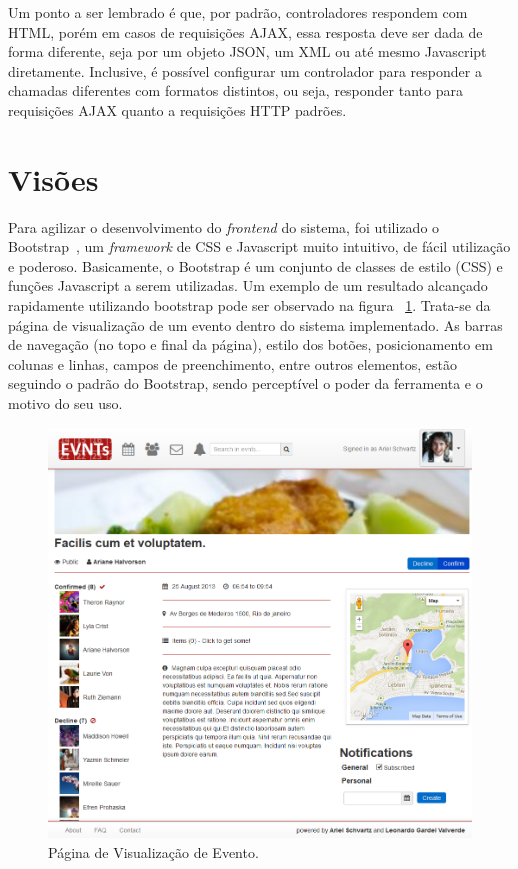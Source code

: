 Um ponto a ser lembrado é que, por padrão, controladores respondem com HTML, porém em casos de requisições AJAX, essa resposta deve ser dada de forma diferente, seja por um objeto JSON, um XML ou até mesmo Javascript diretamente. Inclusive, é possível configurar um controlador para responder a chamadas diferentes com formatos distintos, ou seja, responder tanto para requisições AJAX quanto a requisições HTTP padrões.

\section{Visões}

Para agilizar o desenvolvimento do \textit{frontend} do sistema, foi utilizado o Bootstrap~\cite{bootstrap}, um \textit{framework} de CSS e Javascript muito intuitivo, de fácil utilização e poderoso. Basicamente, o Bootstrap é um conjunto de classes de estilo (CSS) e funções Javascript a serem utilizadas. Um exemplo de um resultado alcançado rapidamente utilizando bootstrap pode ser observado na figura ~\ref{fig:pagvisuevento}. Trata-se da página de visualização de um evento dentro do sistema implementado. As barras de navegação (no topo e final da página), estilo dos botões, posicionamento em colunas e linhas, campos de preenchimento, entre outros elementos, estão seguindo o padrão do Bootstrap, sendo perceptível o poder da ferramenta e o motivo do seu uso.

\begin{figure}[H]
\centering
\includegraphics[width=1\textwidth]{figs/event_show}
\caption[\textit{Página de Visualização de Evento}.]
{Página de Visualização de Evento.}
\label{fig:pagvisuevento}
\end{figure}

